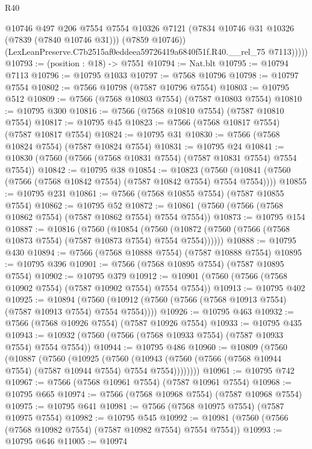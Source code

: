 \begin{lexlean}{R40}
\begin{coremodule}
              @10746
              @497
              @206
              @7554
              @7554
              @10326
              @7121
              (@7834 @10746 @31 @10326 (@7839 (@7840 @10746 @31)))
              (@7859 @10746))
            (LexLeanPreserve.C7b2515af0eddeea59726419a6840f51f.R40.__rel_75 @7113)))))
@10793 := (position : @18) -> @7551
@10794 := Nat.blt
@10795 := @10794 @7113
@10796 := @10795 @1033
@10797 := @7568 @10796
@10798 := @10797 @7554
@10802 := @7566 @10798 (@7587 @10796 @7554)
@10803 := @10795 @512
@10809 := @7566 (@7568 @10803 @7554) (@7587 @10803 @7554)
@10810 := @10795 @300
@10816 := @7566 (@7568 @10810 @7554) (@7587 @10810 @7554)
@10817 := @10795 @45
@10823 := @7566 (@7568 @10817 @7554) (@7587 @10817 @7554)
@10824 := @10795 @31
@10830 := @7566 (@7568 @10824 @7554) (@7587 @10824 @7554)
@10831 := @10795 @24
@10841 := @10830 (@7560 (@7566 (@7568 @10831 @7554) (@7587 @10831 @7554) @7554 @7554))
@10842 := @10795 @38
@10854 := @10823
    (@7560 (@10841 (@7560 (@7566 (@7568 @10842 @7554) (@7587 @10842 @7554) @7554 @7554))))
@10855 := @10795 @231
@10861 := @7566 (@7568 @10855 @7554) (@7587 @10855 @7554)
@10862 := @10795 @52
@10872 := @10861 (@7560 (@7566 (@7568 @10862 @7554) (@7587 @10862 @7554) @7554 @7554))
@10873 := @10795 @154
@10887 := @10816
    (@7560
      (@10854
        (@7560 (@10872 (@7560 (@7566 (@7568 @10873 @7554) (@7587 @10873 @7554) @7554 @7554))))))
@10888 := @10795 @430
@10894 := @7566 (@7568 @10888 @7554) (@7587 @10888 @7554)
@10895 := @10795 @396
@10901 := @7566 (@7568 @10895 @7554) (@7587 @10895 @7554)
@10902 := @10795 @379
@10912 := @10901 (@7560 (@7566 (@7568 @10902 @7554) (@7587 @10902 @7554) @7554 @7554))
@10913 := @10795 @402
@10925 := @10894
    (@7560 (@10912 (@7560 (@7566 (@7568 @10913 @7554) (@7587 @10913 @7554) @7554 @7554))))
@10926 := @10795 @463
@10932 := @7566 (@7568 @10926 @7554) (@7587 @10926 @7554)
@10933 := @10795 @435
@10943 := @10932 (@7560 (@7566 (@7568 @10933 @7554) (@7587 @10933 @7554) @7554 @7554))
@10944 := @10795 @486
@10960 := @10809
    (@7560
      (@10887
        (@7560
          (@10925
            (@7560
              (@10943 (@7560 (@7566 (@7568 @10944 @7554) (@7587 @10944 @7554) @7554 @7554))))))))
@10961 := @10795 @742
@10967 := @7566 (@7568 @10961 @7554) (@7587 @10961 @7554)
@10968 := @10795 @665
@10974 := @7566 (@7568 @10968 @7554) (@7587 @10968 @7554)
@10975 := @10795 @641
@10981 := @7566 (@7568 @10975 @7554) (@7587 @10975 @7554)
@10982 := @10795 @545
@10992 := @10981 (@7560 (@7566 (@7568 @10982 @7554) (@7587 @10982 @7554) @7554 @7554))
@10993 := @10795 @646
@11005 := @10974

\end{coremodule}
\end{lexlean}
